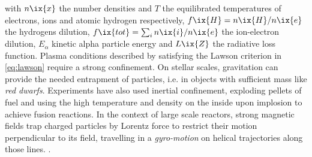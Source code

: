 %
        with $n\ix{x}$ the number densities and $T$ the equilibrated temperatures of electrons, ions and atomic hydrogen respectively, $f\ix{H}=n\ix{H}/n\ix{e}$ the hydrogens dilution, $f\ix{tot}=\sum_{i}n\ix{i}/n\ix{e}$ the ion-electron dilution, $E_{\alpha}$ kinetic alpha particle energy and $L\ix{Z}$ the radiative loss function. Plasma conditions described by satisfying the Lawson criterion in \cref{eq:lawson} require a strong confinement. On stellar scales, gravitation can provide the needed entrapment of particles, i.e. in objects with sufficient mass like \textit{red dwarfs}. Experiments have also used inertial confinement, exploding pellets of fuel and using the high temperature and density on the inside upon implosion to achieve fusion reactions. In the context of large scale reactors, strong magnetic fields trap charged particles by Lorentz force to restrict their motion perpendicular to its field, travelling in a \textit{gyro-motion} on helical trajectories along those lines. \cite{Helander2014,Boozer2015}.\\%
